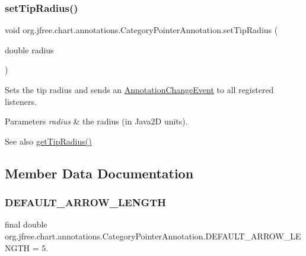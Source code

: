 \subsubsection{\texorpdfstring{set\+Tip\+Radius()}{setTipRadius()}}
{\footnotesize\ttfamily void org.\+jfree.\+chart.\+annotations.\+Category\+Pointer\+Annotation.\+set\+Tip\+Radius (\begin{DoxyParamCaption}\item[{double}]{radius }\end{DoxyParamCaption})}

Sets the tip radius and sends an \mbox{\hyperlink{}{Annotation\+Change\+Event}} to all registered listeners.


\begin{DoxyParams}{Parameters}
{\em radius} & the radius (in Java2D units).\\
\hline
\end{DoxyParams}
\begin{DoxySeeAlso}{See also}
\mbox{\hyperlink{classorg_1_1jfree_1_1chart_1_1annotations_1_1_category_pointer_annotation_a6cb8c5eac8188dee2635a93069dee373}{get\+Tip\+Radius()}} 
\end{DoxySeeAlso}


\subsection{Member Data Documentation}
\mbox{\label{classorg_1_1jfree_1_1chart_1_1annotations_1_1_category_pointer_annotation_abf7cf3025827a83a6e16f1d60cc940a1}} 
\subsubsection{\texorpdfstring{D\+E\+F\+A\+U\+L\+T\+\_\+\+A\+R\+R\+O\+W\+\_\+\+L\+E\+N\+G\+TH}{DEFAULT\_ARROW\_LENGTH}}
{\footnotesize\ttfamily final double org.\+jfree.\+chart.\+annotations.\+Category\+Pointer\+Annotation.\+D\+E\+F\+A\+U\+L\+T\+\_\+\+A\+R\+R\+O\+W\+\_\+\+L\+E\+N\+G\+TH = 5.\hspace{0.3cm}{\ttfamily [static]}}

